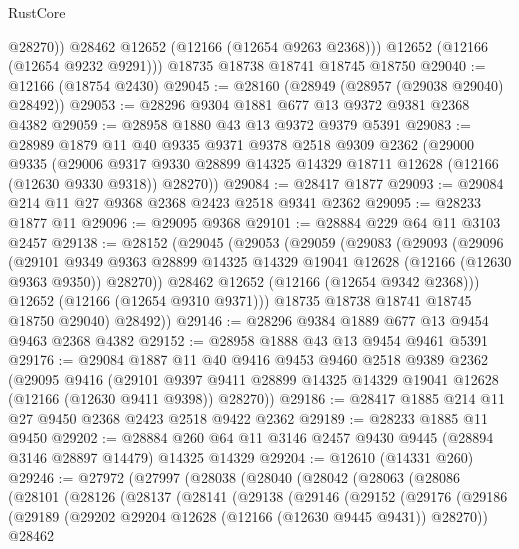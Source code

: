 \begin{lexlean}{RustCore}
\begin{coremodule}
            @28270))
        @28462
        @12652
        (@12166 (@12654 @9263 @2368)))
      @12652
      (@12166 (@12654 @9232 @9291)))
    @18735
    @18738
    @18741
    @18745
    @18750
@29040 := @12166 (@18754 @2430)
@29045 := @28160 (@28949 (@28957 (@29038 @29040) @28492))
@29053 := @28296 @9304 @1881 @677 @13 @9372 @9381 @2368 @4382
@29059 := @28958 @1880 @43 @13 @9372 @9379 @5391
@29083 := @28989
    @1879
    @11
    @40
    @9335
    @9371
    @9378
    @2518
    @9309
    @2362
    (@29000
      @9335
      (@29006 @9317 @9330 @28899 @14325 @14329 @18711 @12628 (@12166 (@12630 @9330 @9318)) @28270))
@29084 := @28417 @1877
@29093 := @29084 @214 @11 @27 @9368 @2368 @2423 @2518 @9341 @2362
@29095 := @28233 @1877 @11
@29096 := @29095 @9368
@29101 := @28884 @229 @64 @11 @3103 @2457
@29138 := @28152
    (@29045
      (@29053
        (@29059
          (@29083
            (@29093
              (@29096
                (@29101
                  @9349
                  @9363
                  @28899
                  @14325
                  @14329
                  @19041
                  @12628
                  (@12166 (@12630 @9363 @9350))
                  @28270))
              @28462
              @12652
              (@12166 (@12654 @9342 @2368)))
            @12652
            (@12166 (@12654 @9310 @9371)))
          @18735
          @18738
          @18741
          @18745
          @18750
          @29040)
        @28492))
@29146 := @28296 @9384 @1889 @677 @13 @9454 @9463 @2368 @4382
@29152 := @28958 @1888 @43 @13 @9454 @9461 @5391
@29176 := @29084
    @1887
    @11
    @40
    @9416
    @9453
    @9460
    @2518
    @9389
    @2362
    (@29095
      @9416
      (@29101 @9397 @9411 @28899 @14325 @14329 @19041 @12628 (@12166 (@12630 @9411 @9398)) @28270))
@29186 := @28417 @1885 @214 @11 @27 @9450 @2368 @2423 @2518 @9422 @2362
@29189 := @28233 @1885 @11 @9450
@29202 := @28884 @260 @64 @11 @3146 @2457 @9430 @9445 (@28894 @3146 @28897 @14479) @14325 @14329
@29204 := @12610 (@14331 @260)
@29246 := @27972
    (@27997
      (@28038
        (@28040
          (@28042
            (@28063
              (@28086
                (@28101
                  (@28126
                    (@28137
                      (@28141
                        (@29138
                          (@29146
                            (@29152
                              (@29176
                                (@29186
                                  (@29189
                                    (@29202 @29204 @12628 (@12166 (@12630 @9445 @9431)) @28270))
                                  @28462

\end{coremodule}
\end{lexlean}
